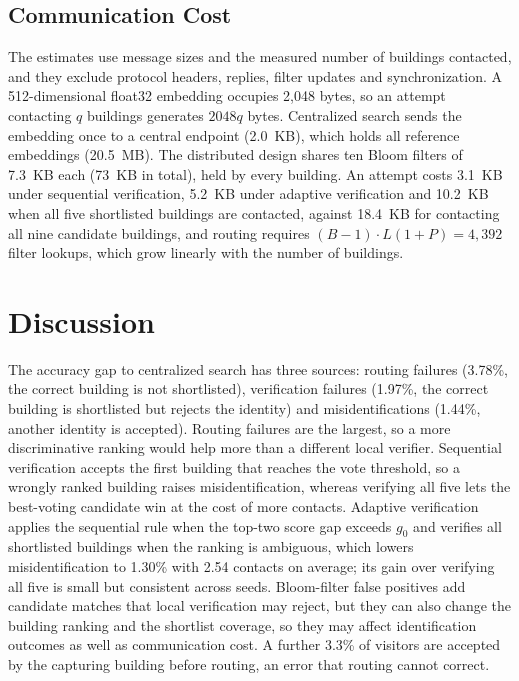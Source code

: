 \documentclass[pdflatex,sn-mathphys-num]{sn-jnl}%
\theoremstyle{thmstyleone}%
\theoremstyle{thmstyletwo}%
\theoremstyle{thmstylethree}%
\begin{document}
\subsection{Communication Cost}
\label{sec:cost}

The estimates use message sizes and the measured number of buildings contacted, and they exclude protocol headers, replies, filter updates and synchronization. A 512-dimensional float32 embedding occupies 2,048 bytes, so an attempt contacting $q$ buildings generates $2048q$ bytes. Centralized search sends the embedding once to a central endpoint (2.0~KB), which holds all reference embeddings (20.5~MB). The distributed design shares ten Bloom filters of 7.3~KB each (73~KB in total), held by every building. An attempt costs 3.1~KB under sequential verification, 5.2~KB under adaptive verification and 10.2~KB when all five shortlisted buildings are contacted, against 18.4~KB for contacting all nine candidate buildings, and routing requires $(B-1)\cdot L(1+P)=4{,}392$ filter lookups, which grow linearly with the number of buildings.


\section{Discussion}
\label{sec:discussion}

The accuracy gap to centralized search has three sources: routing failures (3.78\%, the correct building is not shortlisted), verification failures (1.97\%, the correct building is shortlisted but rejects the identity) and misidentifications (1.44\%, another identity is accepted). Routing failures are the largest, so a more discriminative ranking would help more than a different local verifier. Sequential verification accepts the first building that reaches the vote threshold, so a wrongly ranked building raises misidentification, whereas verifying all five lets the best-voting candidate win at the cost of more contacts. Adaptive verification applies the sequential rule when the top-two score gap exceeds $g_0$ and verifies all shortlisted buildings when the ranking is ambiguous, which lowers misidentification to 1.30\% with 2.54 contacts on average; its gain over verifying all five is small but consistent across seeds. Bloom-filter false positives add candidate matches that local verification may reject, but they can also change the building ranking and the shortlist coverage, so they may affect identification outcomes as well as communication cost. A further 3.3\% of visitors are accepted by the capturing building before routing, an error that routing cannot correct.
\end{document}
